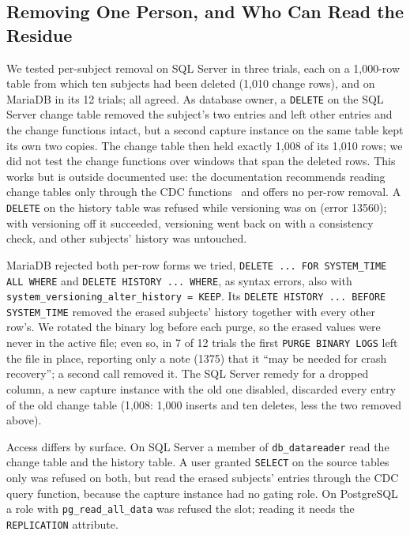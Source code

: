 \documentclass[runningheads]{llncs}
\begin{document}
\subsection{Removing One Person, and Who Can Read the Residue}

We tested per-subject removal on SQL Server in three trials, each on a
1,000-row table from which ten subjects had been deleted (1,010 change rows),
and on MariaDB in its 12 trials; all agreed. As database owner, a \texttt{DELETE} on the SQL
Server change table removed the subject's two entries and left other entries
and the change functions intact, but a second capture instance on the same
table kept its own two copies. The change table then held exactly 1,008 of
its 1,010 rows; we did not test the change functions over windows that span the
deleted rows.
This works but is outside documented use: the
documentation recommends reading change tables only through the CDC
functions~\cite{mscdcct} and offers no per-row removal. A \texttt{DELETE} on the history table was
refused while versioning was on (error 13560); with versioning off it
succeeded, versioning went back on with a consistency check, and other
subjects' history was untouched.

\begin{sloppypar}
MariaDB rejected both per-row forms we tried, \texttt{DELETE ... FOR
SYSTEM\_TIME ALL WHERE} and \texttt{DELETE HISTORY ... WHERE}, as syntax errors,
also with \texttt{system\_versioning\_\allowbreak alter\_\allowbreak history = KEEP}. Its
\texttt{DELETE HISTORY ... BEFORE SYSTEM\_TIME} removed the erased subjects'
history together with every other row's. We rotated the binary log before each
purge, so the erased values were never in the active file; even so, in 7 of 12
trials the first \texttt{PURGE BINARY LOGS} left the file in place, reporting
only a note (1375) that it ``may be needed for crash recovery''; a second call
removed it. The SQL Server remedy for a dropped column, a new capture instance
with the old one disabled, discarded every entry of the old change table
(1,008: 1,000 inserts and ten deletes, less the two removed above).
\end{sloppypar}


Access differs by surface. On SQL Server a member of \texttt{db\_datareader}
read the change table and the history table. A user granted \texttt{SELECT} on
the source tables only was refused on both, but read the erased subjects'
entries through the CDC query function, because the capture instance had no
gating role. On PostgreSQL a role with \texttt{pg\_read\_all\_data} was refused
the slot; reading it needs the \texttt{REPLICATION} attribute.
\end{document}
